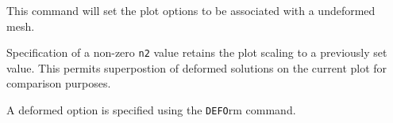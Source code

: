 \headb

This command will set the plot options to be associated
with a undeformed mesh.

Specification of a non-zero {\tt n2} value retains the plot
scaling to a previously set value.  This permits superpostion
of deformed solutions on the current plot for comparison purposes.

A deformed option is specified using the {\tt DEFO}rm command.
\vfill
\eject
